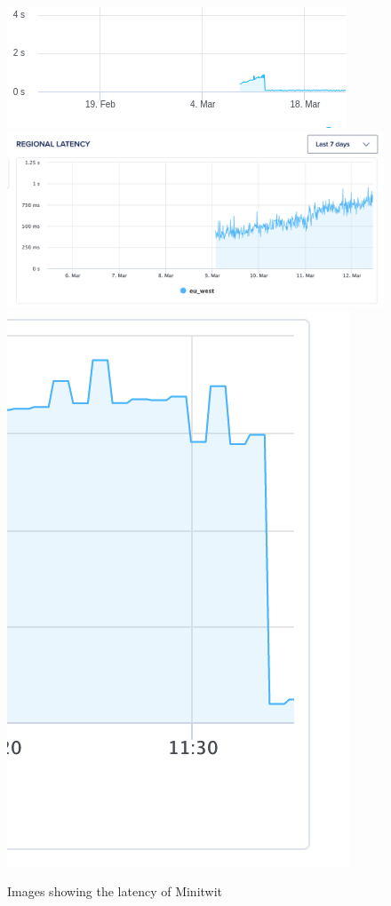 \begin{figure}[H]
    \centering
    \includegraphics[scale=.9]{img/indexing_latency_3.png}
    \includegraphics[scale=.4]{img/indexing_Latency_2.png}
    \includegraphics[scale=.4]{img/indexing_Latency_1.png}
    \caption{Images showing the latency of Minitwit}
    \label{fig:Indexing latency problem}
\end{figure}


